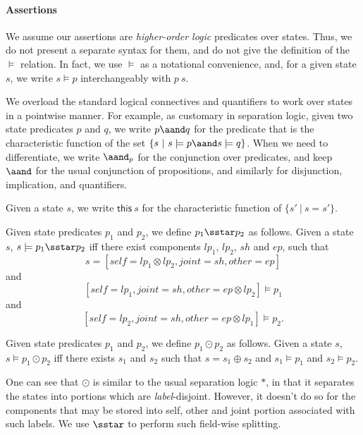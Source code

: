 \paragraph{Assertions}

We assume our assertions are \emph{higher-order logic} predicates over
states. Thus, we do not present a
separate syntax for them, and do not give the definition of the
$\models$ relation. In fact, we use $\models$ as a notational
convenience, and, for a given state $s$, we write $s \models p$
interchangeably with $p\ s$.

We overload the standard logical connectives and quantifiers to work
over states in a pointwise manner. For example, as customary in
separation logic, given two state predicates $p$ and $q$, we write $p
\aand q$ for the predicate that is the characteristic function of the
set $\{s ~|~ s \models p \aand s \models q\}$. When we need to
differentiate, we write $\aand_p$ for the conjunction over predicates,
and keep $\aand$ for the usual conjunction of propositions, and
similarly for disjunction, implication, and quantifiers.

Given a state $s$, we write $\mathsf{this}\ s$ for the characteristic
function of $\{s' ~|~ s = s'\}$.

Given state predicates $p_1$ and $p_2$, we define $p_1 \sstar p_2$ as
follows. Given a state $s$, $s \models p_1 \sstar p_2$ iff there
exist components $lp_1$, $lp_2$, $sh$ and $ep$, such that
\[s = [self=lp_1 \otimes lp_2, joint=sh,  other=ep]\] and
\[[self = lp_1, joint=sh, other=ep \otimes lp_2] \models p_1\]
and
\[[self = lp_2, joint=sh, other=ep \otimes lp_1] \models p_2.\]


Given state predicates $p_1$ and $p_2$, we define $p_1 \odot p_2$ as
follows. Given a state $s$, $s \models p_1 \odot p_2$ iff there exists
$s_1$ and $s_2$ such that $s = s_1 \oplus s_2$ and $s_1 \models p_1$
and $s_2 \models p_2$.

One can see that $\odot$ is similar to the usual separation logic $*$,
in that it separates the states into portions which are
\emph{label}-disjoint. However, it doesn't do so for the components
that may be stored into self, other and joint portion associated with
such labels. We use $\sstar$ to perform such field-wise splitting.


